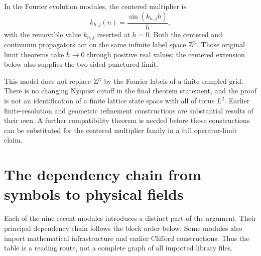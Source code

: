 In the Fourier evolution modules, the centered multiplier is
\[
 k_{h,j}(n)=\frac{\sin(k_{n,j}h)}{h},
\]
with the removable value \(k_{n,j}\) inserted at \(h=0\). Both the centered and continuum propagators act on the same infinite label space \(\mathbb Z^3\). Those original limit theorems take \(h\to0\) through positive real values; the centered extension below also supplies the two-sided punctured limit.

This model does not replace \(\mathbb Z^3\) by the Fourier labels of a finite sampled grid. There is no changing Nyquist cutoff in the final theorem statement, and the proof is not an identification of a finite lattice state space with all of torus \(L^2\). Earlier finite-resolution and geometric refinement constructions are substantial results of their own. A further compatibility theorem is needed before those constructions can be substituted for the centered multiplier family in a full operator-limit claim.

\section{The dependency chain from symbols to physical fields}

Each of the nine recent modules introduces a distinct part of the argument. Their principal dependency chain follows the block order below. Some modules also import mathematical infrastructure and earlier Clifford constructions. Thus the table is a reading route, not a complete graph of all imported library files.

